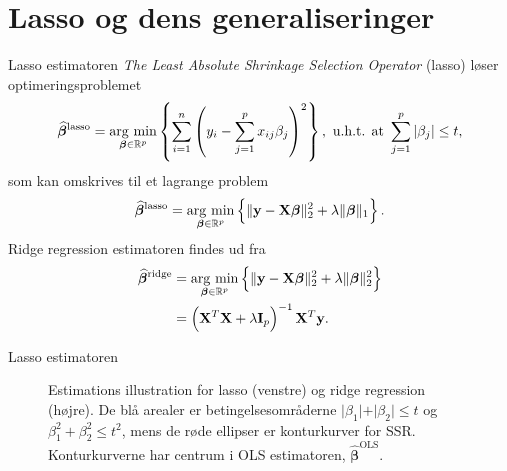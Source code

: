 \section{Lasso og dens generaliseringer}
\begin{frame}{Lasso estimatoren}
\textit{The Least Absolute Shrinkage Selection Operator} (lasso) løser optimeringsproblemet
\begin{align*}
\widehat{\boldsymbol{\beta}}^\text{lasso} = \argmin_{\boldsymbol{\beta} \in \R^p} \cbr{\sum_{i=1}^n \del{y_i - \sum_{j=1}^p x_{ij} \beta_j}^2}, \ \text{u.h.t. at } \sum_{j=1}^p \vert \beta_j \vert \leq t,
\end{align*} 
som kan omskrives til et lagrange problem
\begin{align*}
\widehat{\boldsymbol{\beta}}^\text{lasso} = \argmin_{\boldsymbol{\beta} \in \R^p} \cbr{ \Vert \mathbf{y} - \mathbf{X} \boldsymbol{\beta} \Vert_2^2 + \lambda \Vert \boldsymbol{\beta} \Vert_1}.
\end{align*}
Ridge regression estimatoren findes ud fra
\begin{align*}
\widehat{\boldsymbol{\beta}}^\text{ridge} &= \argmin_{\boldsymbol{\beta} \in \R^p} \cbr{ \Vert \mathbf{y} - \mathbf{X} \boldsymbol{\beta} \Vert_2^2 + \lambda \Vert \boldsymbol{\beta} \Vert_2^2} \\
&= \del{\mathbf{X}^T \mathbf{X} + \lambda \mathbf{I}_p}^{-1} \mathbf{X}^T \mathbf{y}.
\end{align*} 
\end{frame}

\begin{frame}{Lasso estimatoren}
\begin{figure}[H]
\centering
\begin{minipage}{0.4\linewidth}
\scalebox{0.6}{}
\end{minipage}
\hspace{0.2cm}
\begin{minipage}{0.4\linewidth}
\scalebox{0.6}{}
\end{minipage}
\caption{Estimations illustration for lasso (venstre) og ridge regression (højre). 
De blå arealer er betingelsesområderne $\vert \beta_1 \vert+\vert \beta_2 \vert \leq t$ og $\beta_1^2+\beta_2^2 \leq t^2$, mens de røde ellipser er konturkurver for SSR. Konturkurverne har centrum i OLS estimatoren, $\widehat{\boldsymbol{\beta}}^\text{OLS}$.}
\end{figure}
\end{frame}



